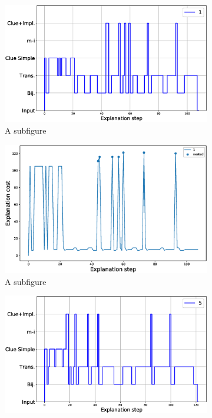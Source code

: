 \begin{figure}
	\centering
	\begin{subfigure}{.5\textwidth}
		\centering
		\includegraphics[width=0.98\linewidth]{figures/plot_cost_steps_1.eps}
		\caption{A subfigure}
	\end{subfigure}%
	\begin{subfigure}{.5\textwidth}
		\centering
		\includegraphics[width=0.9\linewidth]{figures/1.eps}
		\caption{A subfigure}
	\end{subfigure}
	\begin{subfigure}{.5\textwidth}
		\centering
		\includegraphics[width=0.98\linewidth]{figures/plot_cost_steps_5.eps}

\end{subfigure}
\end{figure}
